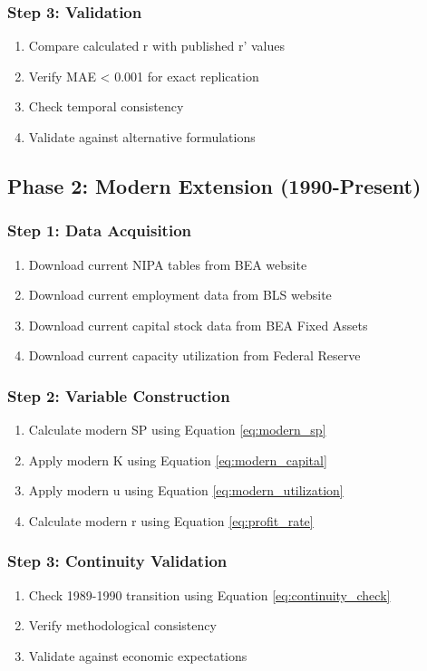 \documentclass[12pt,a4paper]{article}
\begin{document}
\subsubsection{Step 3: Validation}
\begin{enumerate}
    \item Compare calculated r with published r' values
    \item Verify MAE < 0.001 for exact replication
    \item Check temporal consistency
    \item Validate against alternative formulations
\end{enumerate}

\subsection{Phase 2: Modern Extension (1990-Present)}

\subsubsection{Step 1: Data Acquisition}
\begin{enumerate}
    \item Download current NIPA tables from BEA website
    \item Download current employment data from BLS website
    \item Download current capital stock data from BEA Fixed Assets
    \item Download current capacity utilization from Federal Reserve
\end{enumerate}

\subsubsection{Step 2: Variable Construction}
\begin{enumerate}
    \item Calculate modern SP using Equation \ref{eq:modern_sp}
    \item Apply modern K using Equation \ref{eq:modern_capital}
    \item Apply modern u using Equation \ref{eq:modern_utilization}
    \item Calculate modern r using Equation \ref{eq:profit_rate}
\end{enumerate}

\subsubsection{Step 3: Continuity Validation}
\begin{enumerate}
    \item Check 1989-1990 transition using Equation \ref{eq:continuity_check}
    \item Verify methodological consistency
    \item Validate against economic expectations
\end{enumerate}
\end{document}
